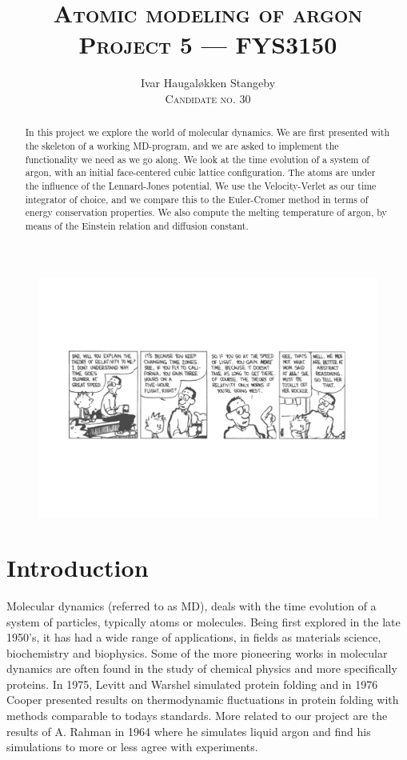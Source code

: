\documentclass[a4paper]{article}
\title{%
    \textsc{Atomic modeling of argon}\\
    \footnotesize{\textsc{Project 5 --- FYS3150}}
}
\author{%
    Ivar Haugal{\o}kken Stangeby\\
    \footnotesize{\textsc{Candidate no. 30}}
}
\begin{document}
\maketitle    

\begin{figure}[h]
    \centering
    \includegraphics[width=\linewidth]{ch.pdf}
\end{figure}

\begin{abstract}
    In this project we explore the world of molecular dynamics. We are first
    presented with the skeleton of a working MD-program, and we are asked to
    implement the functionality we need as we go along. We look at the time
    evolution of a system of argon, with an initial face-centered cubic lattice
    configuration. The atoms are under the influence of the Lennard-Jones
    potential. We use the Velocity-Verlet as our time integrator of choice, and
    we compare this to the Euler-Cromer method in terms of energy conservation
    properties. We also compute the melting temperature of argon, by means of
    the Einstein relation and diffusion constant.
\end{abstract}
\clearpage
\doublespacing
\tableofcontents
\listoffigures      
\singlespacing
\clearpage
\section{Introduction}
\label{sec:introduction}

    Molecular dynamics (referred to as MD), deals with the time evolution of a
    system of particles, typically atoms or molecules. Being first explored in
    the late 1950's, it has had a wide range of applications, in fields as
    materials science, biochemistry and biophysics. Some of the more pioneering
    works in molecular dynamics are often found in the study of chemical
    physics and more specifically proteins.  In 1975, Levitt and Warshel
    \cite{folding} simulated protein folding and in 1976 Cooper
    \cite{thermoprotein} presented results on thermodynamic fluctuations in
    protein folding with methods comparable to todays standards. More related
    to our project are the results of A. Rahman in 1964 \cite{liquid_argon}
    where he simulates liquid argon and find his simulations to more or less
    agree with experiments. 
    
\end{document}

